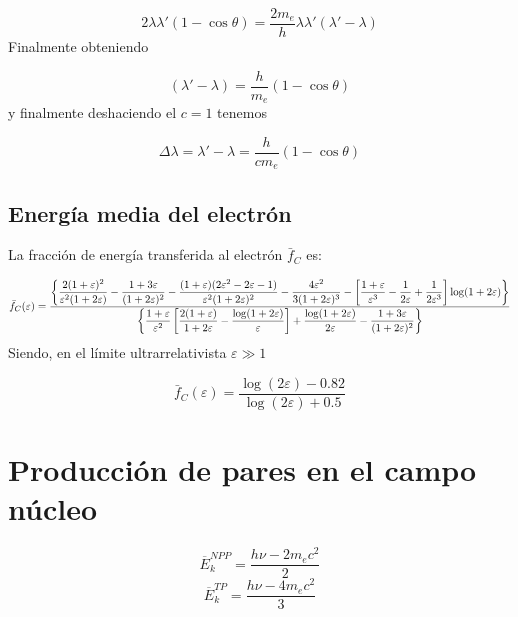 \begin{equation}
    2\lambda \lambda' (1-\cos \theta) = \frac{2 m_e}{h}  \lambda \lambda' (\lambda'-\lambda)
\end{equation}
Finalmente obteniendo 

\begin{equation}
     (\lambda'-\lambda)= \frac{h}{m_e}(1-\cos \theta) 
\end{equation}
y finalmente deshaciendo el $c=1$ tenemos 

\begin{equation}
    \Delta \lambda = \lambda'-\lambda = \frac{h}{cm_e}(1-\cos \theta) 
\end{equation}

\subsection{Energía media del electrón}

La fracción de energía transferida al electrón $\bar{f}_C$ es: 

\begin{equation} \scriptsize
\bar{f}_C(\varepsilon) =
\frac{
\left\{
\dfrac{2(1+\varepsilon)^2}{\varepsilon^2(1+2\varepsilon)}
- \dfrac{1+3\varepsilon}{(1+2\varepsilon)^2}
- \dfrac{(1+\varepsilon)(2\varepsilon^2 - 2\varepsilon - 1)}{\varepsilon^2(1+2\varepsilon)^2}
- \dfrac{4\varepsilon^2}{3(1+2\varepsilon)^3}
- \left[\dfrac{1+\varepsilon}{\varepsilon^3} - \dfrac{1}{2\varepsilon} + \dfrac{1}{2\varepsilon^3}\right] \log(1+2\varepsilon)
\right\}
}{
\left\{
\dfrac{1+\varepsilon}{\varepsilon^2} \left[\dfrac{2(1+\varepsilon)}{1+2\varepsilon} - \dfrac{\log(1+2\varepsilon)}{\varepsilon}\right]
+ \dfrac{\log(1+2\varepsilon)}{2\varepsilon}
- \dfrac{1+3\varepsilon}{(1+2\varepsilon)^2}
\right\}
}
\end{equation}
Siendo, en el límite ultrarrelativista $\varepsilon\gg 1$


\begin{equation} 
\bar{f}_C(\varepsilon) = \frac{\log (2\varepsilon)-0.82}{\log(2\varepsilon)+0.5}
\end{equation}

\section{Producción de pares en el campo núcleo}

\begin{equation}
    \overline{E}_{k}^{NPP} = \frac{h \nu - 2 m_e c^2}{2} 
\end{equation}
\begin{equation}
    \overline{E}_{k}^{TP}= \frac{h \nu - 4 m_e c^2}{3} 
\end{equation}

